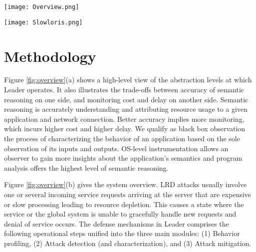 \documentclass[conference]{IEEEtran}
\begin{document}
\begin{figure*} 
\begin{center}
\texttt{[image: Overview.png]}
	\caption{Monitoring and system overview: novelty of our approach lies in our connection life stages and
code path abstractions, which are built from monitoring the system at network, OS and application levels.  \label{fig:overview}}
\end{center}
\end{figure*}

\begin{figure*} 
\begin{center}
\texttt{[image: Slowloris.png]}
	\caption{Life-stage diagrams for Slowloris attack: highlighted items show anomalies.  \label{fig:slowloris}}
\end{center}
\end{figure*}

\section{Methodology}

Figure \ref{fig:overview}(a) shows a high-level view of the abstraction levels at which Leader operates. It also illustrates the trade-offs between accuracy of semantic reasoning on one side, and monitoring cost and delay on another side. Semantic reasoning is accurately understanding and attributing resource usage to a given application and network connection. Better accuracy implies more monitoring, which incurs higher cost and higher delay. We qualify as black box observation the process of characterizing the behavior of an application based on the sole observation of its inputs and outputs. OS-level instrumentation allows an observer to gain more insights about the application’s semantics and program analysis offers the highest level of semantic reasoning.

Figure \ref{fig:overview}(b) gives the system overview. LRD attacks usually involve one or several incoming service requests arriving at the server that are expensive or slow processing leading to resource depletion. This causes a state where the service or the global system is unable to gracefully handle new requests and denial of service occurs.
The defense mechanisms in Leader comprises the following operational steps unified into the three main modules: (1) Behavior profiling, (2) Attack detection (and characterization), and (3) Attack mitigation.
\end{document}
